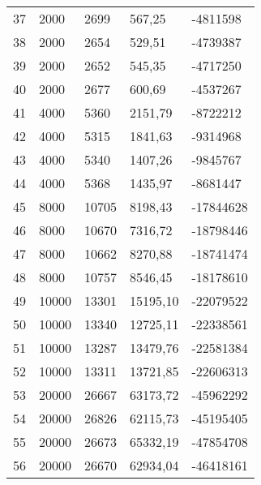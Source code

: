 \begin{longtable}{lllll}
    37               & 2000           & 2699           & 567,25      & -4811598        \\
    38               & 2000           & 2654           & 529,51      & -4739387        \\
    39               & 2000           & 2652           & 545,35      & -4717250        \\
    40               & 2000           & 2677           & 600,69      & -4537267        \\
    41               & 4000           & 5360           & 2151,79     & -8722212        \\
    42               & 4000           & 5315           & 1841,63     & -9314968        \\
    43               & 4000           & 5340           & 1407,26     & -9845767        \\
    44               & 4000           & 5368           & 1435,97     & -8681447        \\
    45               & 8000           & 10705          & 8198,43     & -17844628       \\
    46               & 8000           & 10670          & 7316,72     & -18798446       \\
    47               & 8000           & 10662          & 8270,88     & -18741474       \\
    48               & 8000           & 10757          & 8546,45     & -18178610       \\
    49               & 10000          & 13301          & 15195,10    & -22079522       \\
    50               & 10000          & 13340          & 12725,11    & -22338561       \\
    51               & 10000          & 13287          & 13479,76    & -22581384       \\
    52               & 10000          & 13311          & 13721,85    & -22606313       \\
    53               & 20000          & 26667          & 63173,72    & -45962292       \\
    54               & 20000          & 26826          & 62115,73    & -45195405       \\
    55               & 20000          & 26673          & 65332,19    & -47854708       \\
    56               & 20000          & 26670          & 62934,04    & -46418161       \\

\end{longtable}
